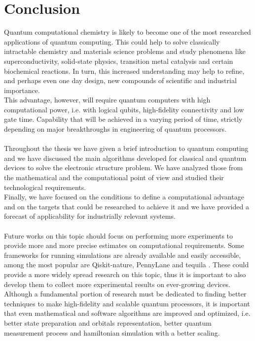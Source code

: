 \chapter*{Conclusion} \label{Conclusion}

Quantum computational chemistry is likely to become one of the most researched applications of quantum computing. This could help to solve classically intractable chemistry and materials science problems and study phenomena like superconductivity, solid-state physics, transition metal catalysis and certain biochemical reactions. In turn, this increased understanding may help to refine, and perhaps even one day design, new compounds of scientific and industrial importance. \\
This advantage, however, will require quantum computers with high computational power, i.e. with logical qubits, high-fidelity connectivity and low gate time. Capability that will be achieved in a varying period of time, strictly depending on major breakthroughs in engineering of quantum processors. \\
\\
Throughout the thesis we have given a brief introduction to quantum computing and we have discussed the main algorithms developed for classical and quantum devices to solve the electronic structure problem. We have analyzed those from the mathematical and the computational point of view and studied their technological requirements. \\
Finally, we have focused on the conditions to define a computational advantage and on the targets that could be researched to achieve it and we have provided a forecast of applicability for industrially relevant systems. \\
\\
Future works on this topic should focus on performing more experiments to provide more and more precise estimates on computational requirements. Some frameworks for running simulations are already available and easily accessible, among the most popular are Qiskit-nature, PennyLane and tequila \cite{Kottmann2020Nov}. These could provide a more widely spread research on this topic, thus it is important to also develop them to collect more experimental results on ever-growing devices. \\
Although a fundamental portion of research must be dedicated to finding better techniques to make high-fidelity and scalable quantum processors, it is important that even mathematical and software algorithms are improved and optimized, i.e. better state preparation and orbitals representation, better quantum measurement process and hamiltonian simulation with a better scaling.